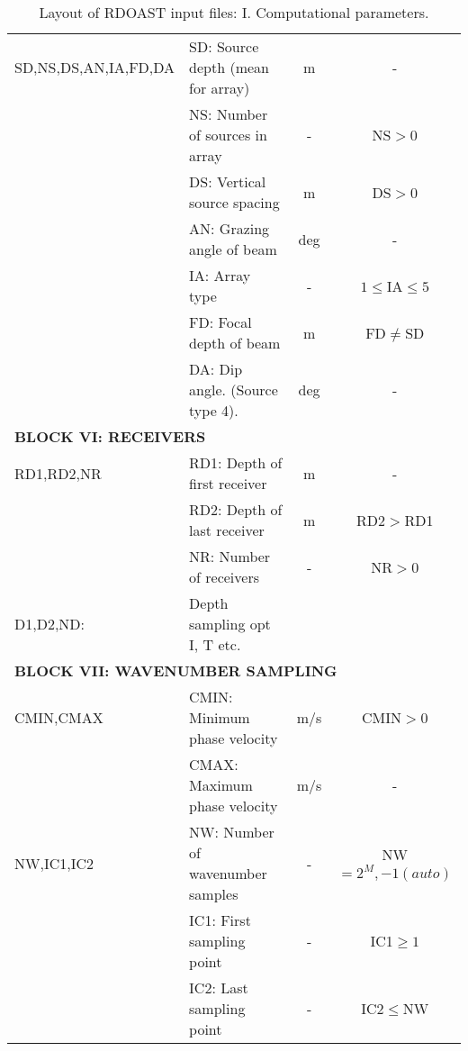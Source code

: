 \begin{table}
\begin{center}
\begin{tabular}{|l|l|c|c|}
\hline
SD,NS,DS,AN,IA,FD,DA & SD: Source depth (mean for array) & m & - \\
	& NS: Number of sources in array & - &  NS$>0$ \\
	& DS: Vertical source spacing	& m & DS$>0$ \\
	& AN: Grazing angle of beam & deg & - \\
	& IA: Array type & - & $1 \leq $IA$\leq 5$ \\
	& FD: Focal depth of beam & m & FD$\neq$SD \\
        & DA: Dip angle. (Source type 4). & deg & - \\
\hline
\multicolumn{4}{|l|}{\bf BLOCK VI: RECEIVERS} \\
\hline
RD1,RD2,NR & RD1: Depth of first receiver & m & - \\
	& RD2: Depth of last receiver  & m & RD2$>$RD1 \\
	& NR: Number of receivers & - & NR$>0$ \\
D1,D2,ND: & Depth sampling opt I, T etc. & & \\
\hline
\multicolumn{4}{|l|}{\bf BLOCK VII: WAVENUMBER SAMPLING} \\
\hline
CMIN,CMAX & CMIN: Minimum phase velocity & m/s & CMIN$>0$ \\
	& CMAX: Maximum phase velocity & m/s & - \\
NW,IC1,IC2 & NW: Number of wavenumber samples & - & NW$=2^{M}, -1 (auto)$ \\
	& IC1: First sampling point & - & IC1$\geq 1$ \\
	& IC2: Last sampling point & - & IC2$\leq$NW \\
\hline
\end{tabular}
\end{center}
\caption{Layout of RDOAST input files: I. Computational parameters.
	\label{tab:rdoast-I} }
\end{table} 

